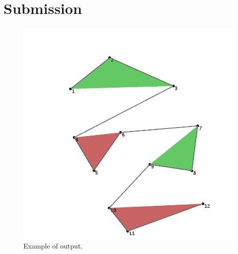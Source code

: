 \documentclass[a4paper,12pt]{article}
\begin{document}
\section{Submission}



\begin{figure}[!h]
\begin{center}
\includegraphics[width=0.85\linewidth]{../images/project0.png}
\end{center}
\caption{Example of output.}
\end{figure}
\end{document}
